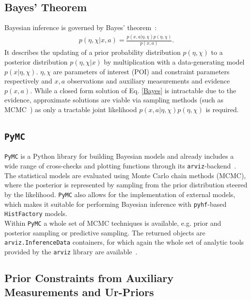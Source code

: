 \subsection{Bayes' Theorem}
Bayesian inference is governed by Bayes' theorem~\cite{ConjPriorsBerkeley}:
    \begin{align} \label{Bayes}
        p(\eta, \chi \vert x, a) = \frac{p(x, a\vert \eta, \chi) p(\eta, \chi)}{p(x, a)}.
    \end{align}
 \noindent It describes the updating of a prior probability distribution $p(\eta, \chi)$ to a posterior distribution $p(\eta, \chi \vert x)$ by multiplication with a data-generating model $p(x \vert \eta, \chi)$. $\eta, \chi$ are parameters of interest (POI) and constraint parameters respectively and $x, a$ observations and auxiliary measurements and evidence $p(x, a)$. While a closed form solution of Eq. \eqref{Bayes} is intractable due to the evidence, approximate solutions are viable via sampling methods (such as MCMC~\cite{PyMC}) as only a tractable joint likelihood $p(x, a \vert \eta, \chi)p(\eta, \chi)$ is required.

\subsection{\texttt{PyMC}}
\texttt{PyMC} is a Python library for building Bayesian models and already includes a wide range of cross-checks and plotting functions through its \texttt{arviz}-backend~\cite{PyMC, arviz}. \\
\noindent The statistical models are evaluated using Monte Carlo chain methods (MCMC), where the posterior is represented by sampling from the prior distribution steered by the likelihood.
\noindent \texttt{PyMC} also allows for the implementation of external models, which makes it suitable for performing Bayesian inference with \texttt{pyhf}-based \texttt{HistFactory} models. \\
Within \texttt{PyMC} a whole set of MCMC techniques is available, e.g. prior and posterior sampling or predictive sampling. The returned objects are \texttt{arviz.InferenceData} containers, for which again the whole set of analytic tools provided by the \texttt{arviz} library are available~\cite{arviz}.


\subsection{Prior Constraints from Auxiliary Measurements and Ur-Priors}

